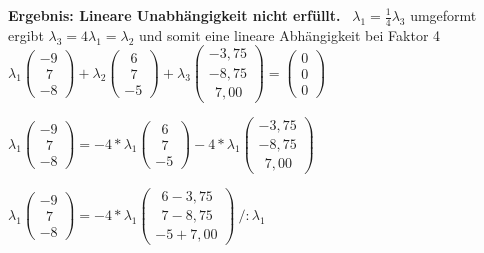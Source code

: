 \documentclass[10pt,ngerman]{scrartcl}
\begin{document}
\begin{enumerate}[1.]
\begin{enumerate}[(a)]
	\textbf{Ergebnis: Lineare Unabhängigkeit nicht erfüllt.}\newline~\newline
	$\lambda _1 = \frac{1}{4} \lambda _3$ umgeformt ergibt $\lambda _3 = 4 \lambda _1 = \lambda _2$ und somit eine lineare Abhängigkeit bei Faktor 4\newline
	\begin{math}\lambda _1\begin{pmatrix}-9 \\ ~~7 \\ -8\end{pmatrix} + \lambda _2 \begin{pmatrix}~~6 \\ ~~7 \\ -5\end{pmatrix} + \lambda _3 \begin{pmatrix}-3,75 \\ -8,75 \\ ~~7,00\end{pmatrix} = \begin{pmatrix}0 \\ 0 \\ 0\end{pmatrix} \end{math}\newline
	
	\begin{math}\lambda _1 \begin{pmatrix}-9 \\ ~~7 \\ -8\end{pmatrix} = - 4*\lambda _1 \begin{pmatrix}~~6 \\ ~~7 \\ -5\end{pmatrix} - 4*\lambda _1 \begin{pmatrix}-3,75 \\ -8,75 \\ ~~7,00\end{pmatrix}\end{math}\newline
	
	\begin{math}\lambda _1 \begin{pmatrix}-9 \\ ~~7 \\ -8\end{pmatrix} = - 4*\lambda _1 \begin{pmatrix}~~6-3,75 \\ ~~7-8,75 \\ -5+7,00\end{pmatrix} ~ / :\lambda _ 1\end{math}\newline
	

\end{enumerate}
\end{enumerate}
\end{document}
